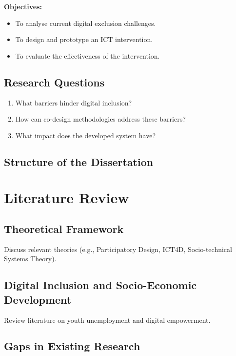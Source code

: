 \documentclass[12pt,a4paper,oneside]{report}
\begin{document}
\textbf{Objectives:}
\begin{itemize}
    \item To analyse current digital exclusion challenges.
    \item To design and prototype an ICT intervention.
    \item To evaluate the effectiveness of the intervention.
\end{itemize}

\section{Research Questions}
\begin{enumerate}
    \item What barriers hinder digital inclusion?
    \item How can co-design methodologies address these barriers?
    \item What impact does the developed system have?
\end{enumerate}

\section{Structure of the Dissertation}

\chapter{Literature Review}

\section{Theoretical Framework}
Discuss relevant theories (e.g., Participatory Design, ICT4D, Socio-technical Systems Theory).

\section{Digital Inclusion and Socio-Economic Development}
Review literature on youth unemployment and digital empowerment.

\section{Gaps in Existing Research}

\end{document}
